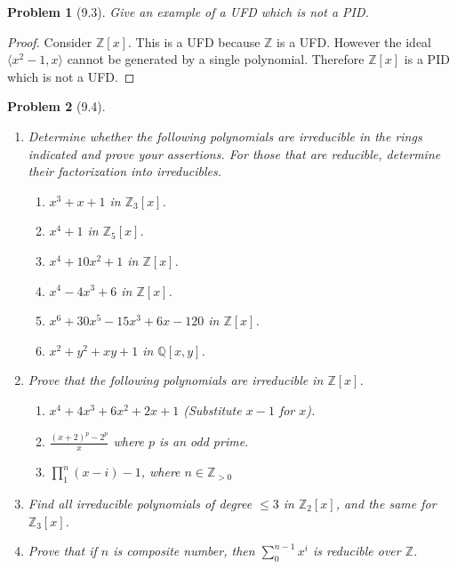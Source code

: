 \documentclass[10pt]{article}
\newcommand{\sk}{\vskip 10mm}
\newcommand{\bb}[1]{\mathbb{#1}}
\theoremstyle{plain}
\newtheorem{problem}{Problem}
\theoremstyle{remark}
\begin{document}
\sk


\begin{problem}[9.3]
  Give an example of a UFD which is not a PID.
\end{problem}

\begin{proof}
  Consider $\bb{Z}[x]$. This is a UFD because $\bb{Z}$ is a UFD. However
  the ideal $\langle x^2-1,x\rangle$ cannot be generated by a single polynomial. Therefore
  $\bb{Z}[x]$ is a PID which is not a UFD.
\end{proof}

\sk


\begin{problem}[9.4]
  \begin{enumerate}
  \item Determine whether the following polynomials are irreducible in
    the rings indicated and prove your assertions. For those that are reducible,
    determine their factorization into irreducibles.
    \begin{enumerate}
    \item $x^3+x+1$ in $\bb{Z}_3[x]$.
    \item $x^4+1$ in $\bb{Z}_5[x]$.
    \item $x^4+10x^2+1$ in $\bb{Z}[x]$.
    \item $x^4-4x^3+6$ in $\bb{Z}[x]$.
    \item $x^6+30x^5-15x^3+6x-120$ in $\bb{Z}[x]$.
    \item $x^2+y^2+xy+1$ in $\bb{Q}[x,y]$.
    \end{enumerate}
  \item Prove that the following polynomials are irreducible in $\bb{Z}[x]$.
    \begin{enumerate}
    \item $x^4+4x^3+6x^2+2x+1$ (Substitute $x-1$ for $x$).
    \item $\frac{(x+2)^p-2^p}{x}$ where $p$ is an odd prime.
    \item $\prod_1^n(x-i) - 1$, where $n\in\bb{Z}_{>0}$
    \end{enumerate}
  \item Find all irreducible polynomials of degree $\leq 3$ in $\bb{Z}_2[x]$,
    and the same for $\bb{Z}_3[x]$.
  \item Prove that if $n$ is composite number, then $\sum_0^{n-1}x^{i}$ is
    reducible over $\bb{Z}$.
  \end{enumerate}
\end{problem}
\end{document}
